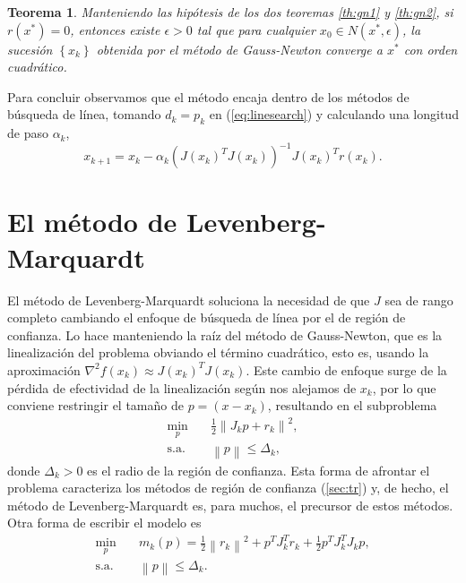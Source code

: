 \documentclass[11pt,a4paper]{book}
\newtheorem{theorem}{Teorema}[chapter]
\theoremstyle{definition}
\theoremstyle{remark}
\newcommand{\norm}[1]{\left\lVert#1\right\rVert}
\newcommand{\sucesionxk}{\left\{x_k\right\}}
\begin{document}
\begin{theorem}
	Manteniendo las hipótesis de los dos teoremas \ref{th:gn1} y \ref{th:gn2}, si $r(x^*)=0$, entonces existe $\epsilon>0$ tal que para cualquier $x_0 \in N(x^*,\epsilon)$, la sucesión $\sucesionxk$ obtenida por el método de Gauss-Newton converge a $x^*$ con orden cuadrático.
\end{theorem}

Para concluir observamos que el método encaja dentro de los métodos de búsqueda de línea, tomando $d_k=p_k$ en  (\ref{eq:linesearch}) y calculando una longitud de paso $\alpha_k$,
\begin{equation}
	x_{k+1} = x_k-\alpha_k(J(x_k)^TJ(x_k))^{-1}J(x_k)^Tr(x_k).
\end{equation}

\chapter{El método de Levenberg-Marquardt}

El método de Levenberg-Marquardt soluciona la necesidad de que $J$ sea de rango completo cambiando el enfoque de búsqueda de línea por el de región de confianza.
Lo hace manteniendo la raíz del método de Gauss-Newton, que es la linealización del problema obviando el término cuadrático, esto es, usando la aproximación $\nabla^2 f(x_k) \approx J(x_k)^TJ(x_k)$.
Este cambio de enfoque surge de la pérdida de efectividad de la linealización según nos alejamos de $x_k$, por lo que conviene restringir el tamaño de $p=(x-x_k)$, resultando en el subproblema
\begin{equation}
\label{min:sublev}
\begin{aligned}
	\min_{p} &\quad \frac{1}{2} \norm{J_kp+r_k}^2,\\
	\text{s.a.} &\quad \norm{p} \leq \Delta_k,
\end{aligned}
\end{equation}
donde $\Delta_k>0$ es el radio de la región de confianza.
Esta forma de afrontar el problema caracteriza los métodos de región de confianza (\ref{sec:tr}) y,
de hecho, el método de Levenberg-Marquardt es, para muchos, el precursor de estos métodos. Otra forma de escribir el modelo es
\begin{equation}
	\begin{aligned}
		\min_{p} &\quad m_k(p)=\frac{1}{2}\norm{r_k}^2 + p^TJ_k^Tr_k + \frac{1}{2}p^TJ_k^TJ_kp, \\
	 \text{s.a.} &\quad \norm{p} \leq \Delta_k.
	\end{aligned}
\end{equation}
\end{document}
